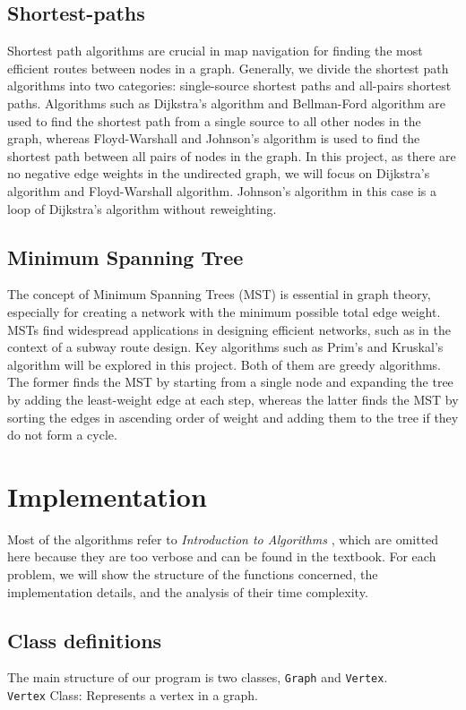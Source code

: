\documentclass[UTF8]{ctexart}
\begin{document}
\subsection{Shortest-paths}
Shortest path algorithms are crucial in map navigation for finding the most efficient routes between nodes in a graph.
Generally, we divide the shortest path algorithms into two categories: single-source shortest paths and all-pairs shortest paths.
Algorithms such as Dijkstra's algorithm and Bellman-Ford algorithm are used to find the shortest path from a single source to all other nodes in the graph, whereas
Floyd-Warshall and Johnson's algorithm is used to find the shortest path between all pairs of nodes in the graph.
In this project, as there are no negative edge weights in the undirected graph, we will focus on Dijkstra's algorithm and Floyd-Warshall algorithm.
Johnson's algorithm in this case is a loop of Dijkstra's algorithm without reweighting.

\subsection{Minimum Spanning Tree}
The concept of Minimum Spanning Trees (MST) is essential in graph theory, especially for creating a network with the minimum possible total edge weight.
MSTs find widespread applications in designing efficient networks, such as in the context of a subway route design.
Key algorithms such as Prim's and Kruskal's algorithm will be explored in this project. Both of them are greedy algorithms.
The former finds the MST by starting from a single node and expanding the tree by adding the least-weight edge at each step,
whereas the latter finds the MST by sorting the edges in ascending order of weight and adding them to the tree if they do not form a cycle.


\section{Implementation}
Most of the algorithms refer to \textit{Introduction to Algorithms} \cite{CLRS}, which are omitted here because they are too verbose and can be found in the textbook.
For each problem, we will show the structure of the functions concerned, the implementation details, and the analysis of
their time complexity.\\

\subsection{Class definitions}
The main structure of our program is two classes, \texttt{Graph} and \texttt{Vertex}.\\
\texttt{Vertex} Class: Represents a vertex in a graph.
\end{document}
